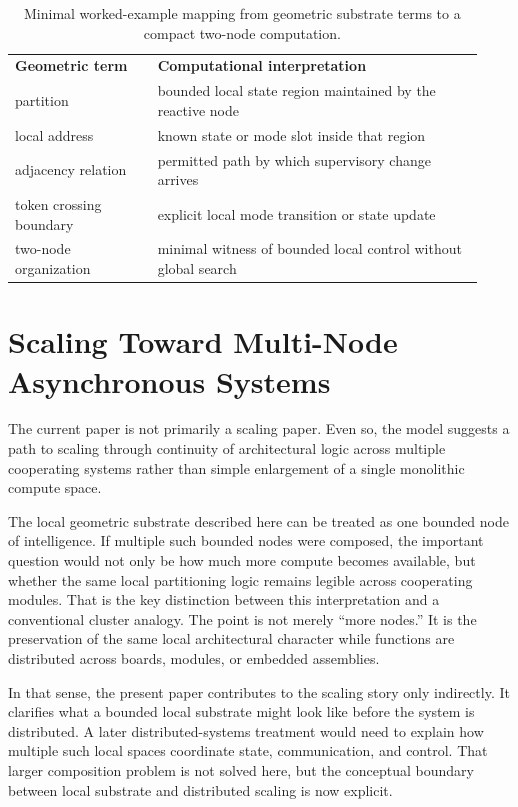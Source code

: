 \documentclass[11pt]{article}
\begin{document}
\begin{table}[H]
\centering
\caption{Minimal worked-example mapping from geometric substrate terms to a compact two-node computation.}
\begin{tabular}{>{\raggedright\arraybackslash}p{0.29\linewidth}>{\raggedright\arraybackslash}p{0.64\linewidth}}
\textbf{Geometric term} & \textbf{Computational interpretation} \\
partition & bounded local state region maintained by the reactive node \\
local address & known state or mode slot inside that region \\
adjacency relation & permitted path by which supervisory change arrives \\
token crossing boundary & explicit local mode transition or state update \\
two-node organization & minimal witness of bounded local control without global search \\
\end{tabular}
\end{table}

\section{Scaling Toward Multi-Node Asynchronous Systems}

The current paper is not primarily a scaling paper. Even so, the model suggests
a path to scaling through continuity of architectural logic across multiple
cooperating systems rather than simple enlargement of a single monolithic
compute space.

The local geometric substrate described here can be treated as one bounded node
of intelligence. If multiple such bounded nodes were composed, the important
question would not only be how much more compute becomes available, but whether
the same local partitioning logic remains legible across cooperating modules.
That is the key distinction between this interpretation and a conventional
cluster analogy. The point is not merely ``more nodes.'' It is the preservation
of the same local architectural character while functions are distributed
across boards, modules, or embedded assemblies.

In that sense, the present paper contributes to the scaling story only
indirectly. It clarifies what a bounded local substrate might look like before
the system is distributed. A later distributed-systems treatment would need to
explain how multiple such local spaces coordinate state, communication, and
control. That larger composition problem is not solved here, but the conceptual
boundary between local substrate and distributed scaling is now explicit.
\end{document}
